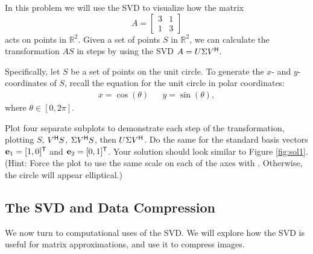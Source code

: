 \begin{problem}
In this problem we will use the SVD to visualize how the matrix
\[A =  \left[\begin{array}{cc}3 & 1\\1 & 3\end{array}\right]\]
acts on points in $\mathbb{R}^2$.
Given a set of points $S$ in $\mathbb{R}^2$, we can calculate the transformation $AS$ in steps by using the SVD $A = U\Sigma V^{\mathsf H}$.

Specifically, let $S$ be a set of points on the unit circle.
To generate the $x$- and $y$-coordinates of $S$, recall the equation for the unit circle in polar coordinates:
\begin{align*}x = \cos(\theta) && y = \sin(\theta),\end{align*}
where $\theta \in [0, 2\pi].$

Plot four separate subplots to demonstrate each step of the transformation, plotting $S$, $V^{\mathsf H} S$, $\Sigma V^{\mathsf H} S$, then $U\Sigma V^{\mathsf H}$.
Do the same for the standard basis vectors $\mathbf{e}_1 = [1, 0]^{\mathsf T}$ and $\mathbf{e}_2 = [0, 1]^{\mathsf T}$.
Your solution should look similar to Figure \ref{fig:sol1}.
\\(Hint: Force the plot to use the same scale on each of the axes with . Otherwise, the circle will appear elliptical.)
\end{problem}

\subsection*{The SVD and Data Compression}
We now turn to computational uses of the SVD. We will explore how the SVD is useful for matrix approximations, and use it to compress images.

